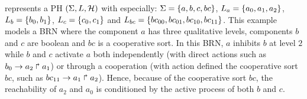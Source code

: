 \begin{example*}
 represents a PH $(\Sigma,L,\mathcal{H})$ with especially:
$\Sigma = \{a,b,c,bc\}$,
$L_a = \{a_0,a_1,a_2\}$,
$L_b = \{b_0, b_1\}$,
$L_c = \{c_0, c_1\}$ and
$L_{bc} = \{bc_{00}, bc_{01}, bc_{10}, bc_{11}\}$.
This example models a BRN where the component $a$ has three qualitative levels, components $b$ and $c$ are boolean and $bc$ is a cooperative sort.
In this BRN, $a$ inhibits $b$ at level $2$ while $b$ and $c$ activate $a$ both independently (with direct actions such as
$b_0\rightarrow a_2\Rsh a_1$) or through a cooperation (with action defined the cooperative sort $bc$, such as
$bc_{11}\rightarrow a_1\Rsh a_2$).
Hence, because of the cooperative sort $bc$, the reachability of $a_2$ and $a_0$ is conditioned by the active process of both $b$ and $c$.

\begin{figure}[h]
\centering
{}
\end{figure}
\end{example*}
